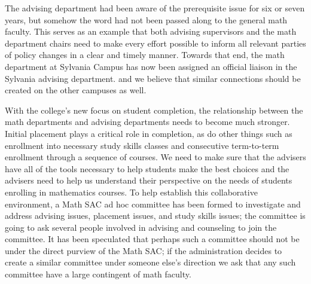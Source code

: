 The advising department had been aware of the prerequisite issue for six or seven years, but somehow the word had not been passed along to the general math faculty.
This serves as an example that both advising supervisors and the math department chairs need to make every effort possible to inform all relevant parties of policy changes in a clear and timely manner.
Towards that end, the math department at Sylvania Campus has now been assigned an official liaison in the Sylvania advising department.
and we believe that similar connections
should be created on the other campuses as well.

With the college's new focus on student completion, the relationship between the math departments and advising departments needs to become much stronger.
Initial placement plays a critical role in completion, as do other things such as enrollment into necessary study skills classes and consecutive term-to-term enrollment through a sequence of courses.
We need to make sure that the advisers have all of the tools necessary to help students make the best choices and the advisers need to help us understand their perspective on the needs of students enrolling in mathematics courses.
To help establish this collaborative environment, a Math SAC ad hoc committee has been formed to investigate and address advising issues, placement issues, and study skills issues;  the committee is going to ask several people involved in advising and counseling to join the committee.
It has been speculated that perhaps such a committee should not be under the direct purview of the Math SAC; if the administration decides to create a similar committee under someone else's direction we ask that any such committee have a large contingent of math faculty.



